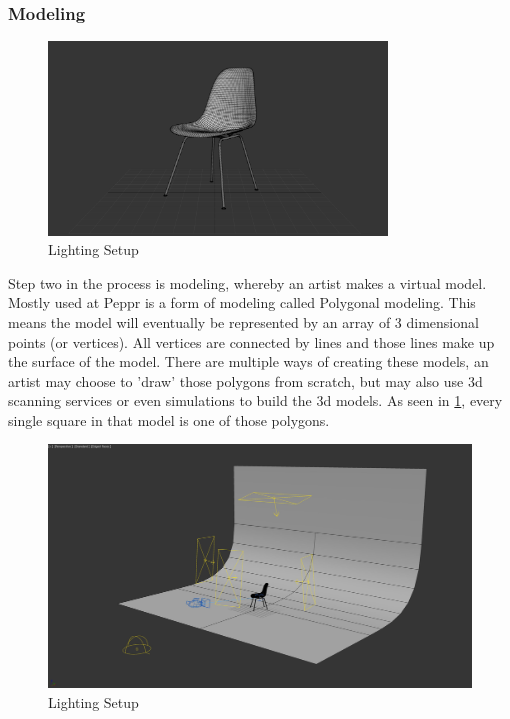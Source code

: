 \subsubsection{Modeling}

\begin{figure}
\vspace{-1cm}
\centering
\includegraphics[width=9cm]{images/modeling}
\caption{Lighting Setup}
\label{figure:modeling}
\end{figure}


Step two in the process is modeling, whereby an artist makes a virtual model. Mostly used at Peppr is a form of modeling called Polygonal modeling. This means the model will eventually be represented by an array of 3 dimensional points (or vertices). All vertices are connected by lines and those lines make up the surface of the model. There are multiple ways of creating these models, an artist may choose to 'draw' those polygons from scratch, but may also use 3d scanning services or even simulations to build the 3d models.
As seen in \ref{figure:modeling}, every single square in that model is one of those polygons.

\clearpage
\begin{figure}
\centering
\includegraphics[width=15cm]{images/lighting}
\caption{Lighting Setup}
\label{figure:lighting}
\end{figure}


